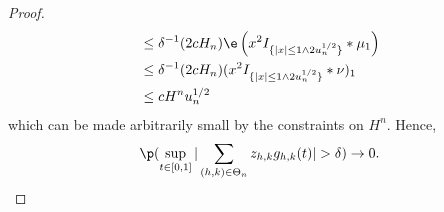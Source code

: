 \begin{proof}
\begin{align}
  &\le\delta^{-1} (2 c H_n)\e\left( x^2I_{\{\vert x\vert \le 1 \wedge 2 u_n^{1/2}\}}\ast\mu_1  \right)\notag \\
  &\le \delta^{-1} (2 c H_n) (x^2I_{\{\vert x\vert \le 1 \wedge 2 u_n^{1/2}\}}\ast\nu)_1\notag \\
  &\le c H^n u^{1/2}_n \notag
\notag
\end{align}
which can be made arbitrarily small by the constraints on $H^n$.
Hence, 
\begin{align}
  \p(\sup_{t \in [0,1]}\vert \sumt z_{h,k} \ghk(t) \vert > \delta) \to 0.\label{eq:z}
\end{align}
\begin{comment}
Meanwhile, on $A_i \cap C_i$, it is easily seen that $\vert \djl \vert - \vert \dxc + \djt \vert < \vert \dx \vert \le u_n^{1/2}$, so that
\begin{align}
  \notag
  \dxf \djt I_{A_i \cap C_i} &\le \dxf \djt I_{\{\vert \djl \vert \le 4 u^{1/2}_n\}}\\
   &\le \dxc \djt I_{\{\vert \djl \vert \le 4 u^{1/2}_n\}} +  \djl \djt I_{\{\vert \djl \vert \le 4 u^{1/2}_n\}}\notag\\
   & =: \theta_i^1 + \theta_i^2\notag. 
  \label{}
\end{align}
Arguing as above, it is easily verified that $\e(\theta_i^1)  \le c \Delta_n^{5/4} u_n^{-1/8}$  so that 
\begin{align} 
  \p( \sup_{t \in \domain}\vert \sumnt \sumin \btghki \theta^1_i \ghk(t)\vert > \eta) \le cH^n (u^{-1/2}_n\Delta_n)^{1/4} \notag \end{align}
Similarly,  $\e(\theta_i^2 I_{\Omega(n,q)}) \le q c \Delta_n u^{-1/4}_n$ so that  
\begin{align} 
  \p( \sup_{t \in \domain}\vert \sumnt \sumin \btghki \theta^2_i &\ghk(t)\vert > \eta) \notag \\ &\le \p(\Omega(n,q)^c) + cH^n (u^{-1/2}_n\Delta_n)^{1/4} \notag \end{align}
Hence, 
\begin{align}
  \p(\sup_{t \in \domain} \vert \sumnt p_{h,k} \ghk(t) \vert > \eta) \to 0.\notag
  \label{}
\end{align}
This completes the demonstration  that 
\begin{align}
  \p(\sup_{t \in \domain} \vert \sumnt y_{h,k} \ghk(t) \vert > \eta) \to 0.\notag
  \label{}
\end{align}


\end{comment}
\end{proof}
